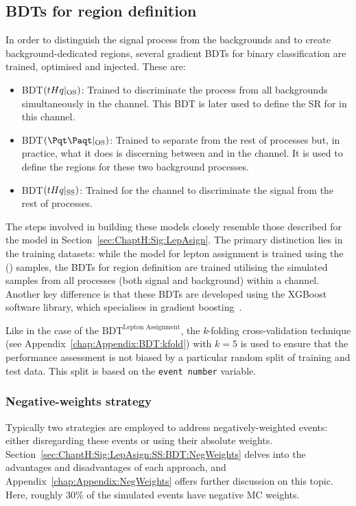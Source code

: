 \subsection{BDTs for region definition}
\label{sec:ChaptH:EventSelection:BDT}
In order to distinguish the \tHq signal process from the backgrounds and to create background-dedicated regions, 
several gradient BDTs for binary classification are trained, optimised and injected. These are:
\begin{itemize}
   \item BDT$(tHq|_{\text{OS}})$: Trained to discriminate the \tHq process from all backgrounds simultaneously
   in the \dilepOStau channel. This BDT is later used to define the SR for \tHq in this channel.
   \item BDT$(\ttbar|_{\text{OS}})$: Trained to separate \ttbar from the rest of processes but, in practice, what it does
   is discerning between \ttbar and \Zjets in the \dilepOStau channel. It is used to define the regions for these two 
   background processes.
   \item  BDT$(tHq|_{\text{SS}})$:  Trained for the \dilepSStau channel to discriminate the \tHq signal from the rest of processes.
\end{itemize}
The steps involved in building these models closely resemble those described for the model in Section~\ref{sec:ChaptH:Sig:LepAsign}. 
The primary distinction lies in the training datasets: while the model for lepton assignment is trained using the \tHq(\dilepSStau) 
samples, the BDTs for region definition are trained utilising the simulated samples from all processes (both signal and background) 
within a channel. Another key difference is that these BDTs are developed using the XGBoost software library, which specialises 
in gradient boosting~\cite{Chen_2016}. %

Like in the case of the $\text{BDT}^{\text{Lepton Assignment}}$, the \textit{k}-folding cross-validation technique (see Appendix~\ref{chap:Appendix:BDT:kfold})
with $k=5$ is used to ensure that the performance assessment is not biased by a particular 
random split of training and test data. This split is based on the \texttt{event number} variable.


\subsubsection{Negative-weights strategy}
\label{sec:ChaptH:EventSelection:BDT:NegativeWeights}
Typically two strategies 
are employed to address negatively-weighted events: either disregarding these events or using their 
absolute weights. Section~\ref{sec:ChaptH:Sig:LepAsign:SS:BDT:NegWeights} delves into the 
advantages and disadvantages of each approach, and Appendix~\ref{chap:Appendix:NegWeights} 
offers further discussion on this topic. Here, roughly 30\% of the simulated events have negative MC weights.

